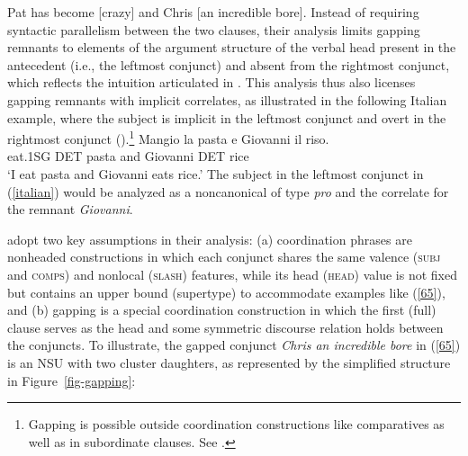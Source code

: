 {\ea Pat has become [crazy] and Chris [an incredible bore]. \citep[248]{Abeille2014}  \label{65}\z
%
Instead of requiring %
syntactic parallelism between the two clauses, their analysis limits gapping remnants to elements of the argument structure of the verbal head present in the antecedent (i.e., the leftmost conjunct) and absent from the rightmost conjunct, which reflects the intuition articulated in \citet{Hankamer1971}. This analysis thus also licenses gapping remnants with implicit correlates, as illustrated in the
following Italian example, where the subject is implicit in the leftmost conjunct and overt in the rightmost conjunct (\citealt[251]{Abeille2014}).\footnote{Gapping is possible outside coordination
constructions like comparatives as well as in 
subordinate clauses. See .}
\ea
\label{italian}
\gll Mangio la pasta e Giovanni il riso.\\
eat.\textsc{1SG} \textsc{DET} pasta and Giovanni \textsc{DET} rice\\
\glt `I eat pasta and Giovanni eats rice.'
\z
%
The subject in the leftmost conjunct in (\ref{italian}) would be analyzed as a noncanonical  of type {\it pro} and the correlate for the remnant {\it Giovanni}. %

\citet{Abeille2014} adopt two  key assumptions in their analysis: (a) coordination phrases are nonheaded constructions in which each conjunct shares the same
valence (\textsc{subj} and \textsc{comps}) and nonlocal (\textsc{slash}) features, while
 its head (\textsc{head}) value is not fixed but contains an upper bound (supertype) to accommodate examples like (\ref{65}), and (b) gapping is a special coordination construction in which the first (full) clause serves as the head 
 and some symmetric discourse relation holds between the conjuncts. 
 To illustrate, the gapped conjunct \emph{Chris an incredible
  bore} in (\ref{65}) is an NSU  with two cluster daughters, as represented by
  the simplified structure in 
  Figure~\ref{fig-gapping}:
 
}
